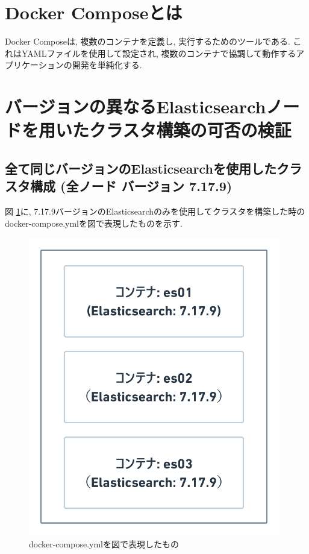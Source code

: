 \section{Docker Composeとは}
Docker Composeは, 複数のコンテナを定義し, 実行するためのツールである. これはYAMLファイルを使用して設定され, 複数のコンテナで協調して動作するアプリケーションの開発を単純化する.

\section{バージョンの異なるElasticsearchノードを用いたクラスタ構築の可否の検証}
\subsection{全て同じバージョンのElasticsearchを使用したクラスタ構成 (全ノード バージョン 7.17.9)}

図 \ref{4-p3}に, 7.17.9バージョンのElasticsearchのみを使用してクラスタを構築した時のdocker-compose.ymlを図で表現したものを示す.

\begin{figure}[H]
  \begin{center}
    \includegraphics[width=110mm]{sotu/figure/all-7.19.9.png}
    \caption{docker-compose.ymlを図で表現したもの}
    \label{4-p3}
  \end{center}
\end{figure}

